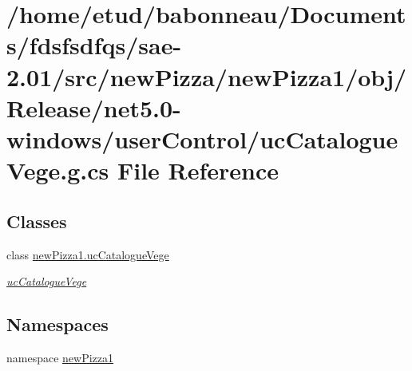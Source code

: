 \hypertarget{Release_2net5_80-windows_2userControl_2ucCatalogueVege_8g_8cs}{}\section{/home/etud/babonneau/\+Documents/fdsfsdfqs/sae-\/2.01/src/new\+Pizza/new\+Pizza1/obj/\+Release/net5.0-\/windows/user\+Control/uc\+Catalogue\+Vege.g.\+cs File Reference}
\label{Release_2net5_80-windows_2userControl_2ucCatalogueVege_8g_8cs}
\subsection*{Classes}
\begin{DoxyCompactItemize}
\item 
class \hyperlink{classnewPizza1_1_1ucCatalogueVege}{new\+Pizza1.\+uc\+Catalogue\+Vege}
\begin{DoxyCompactList}\small\item\em \hyperlink{classnewPizza1_1_1ucCatalogueVege}{uc\+Catalogue\+Vege} \end{DoxyCompactList}\end{DoxyCompactItemize}
\subsection*{Namespaces}
\begin{DoxyCompactItemize}
\item 
namespace \hyperlink{namespacenewPizza1}{new\+Pizza1}
\end{DoxyCompactItemize}
